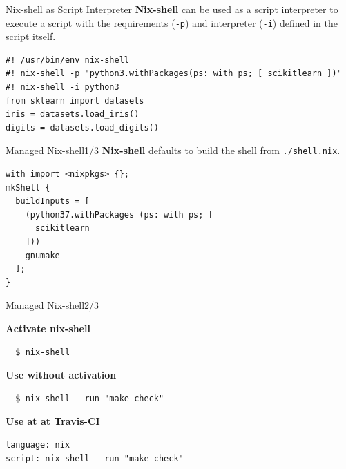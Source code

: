 \documentclass[12pt,aspectratio=169]{beamer}
\begin{document}

\begin{frame}[fragile]{Nix-shell as Script Interpreter}
  \textbf{Nix-shell} can be used as a script interpreter to execute a script with the requirements (\texttt{-p}) and interpreter (\texttt{-i}) defined in the script itself.
  \begin{verbatim}
#! /usr/bin/env nix-shell
#! nix-shell -p "python3.withPackages(ps: with ps; [ scikitlearn ])"
#! nix-shell -i python3
from sklearn import datasets
iris = datasets.load_iris()
digits = datasets.load_digits()
  \end{verbatim}
\end{frame}


\begin{frame}[fragile]{Managed Nix-shell\hfill1/3}
  \textbf{Nix-shell} defaults to build the shell from \texttt{./shell.nix}.
  \begin{verbatim}
with import <nixpkgs> {};
mkShell {
  buildInputs = [
    (python37.withPackages (ps: with ps; [
      scikitlearn
    ]))
    gnumake
  ];
}
  \end{verbatim}
\end{frame}


\begin{frame}[fragile]{Managed Nix-shell\hfill2/3}

  \textbf{Activate nix-shell}
  \begin{verbatim}
  $ nix-shell
  \end{verbatim}

  \textbf{Use without activation}
  \begin{verbatim}
  $ nix-shell --run "make check"
  \end{verbatim}

  \textbf{Use at at Travis-CI}
  \begin{verbatim}
language: nix
script: nix-shell --run "make check"
  \end{verbatim}

\end{frame}

\end{document}

